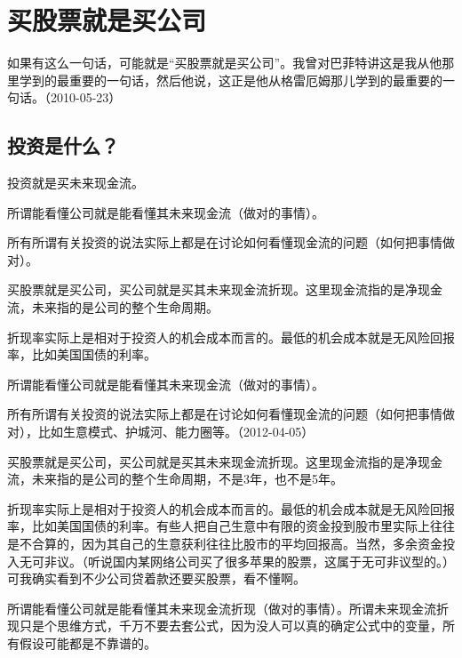 
\section{买股票就是买公司}


如果有这么一句话，可能就是“买股票就是买公司”。我曾对巴菲特讲这是我从他那里学到的最重要的一句话，然后他说，这正是他从格雷厄姆那儿学到的最重要的一句话。（2010-05-23）

\subsection{投资是什么？}


投资就是买未来现金流。

所谓能看懂公司就是能看懂其未来现金流（做对的事情）。

所有所谓有关投资的说法实际上都是在讨论如何看懂现金流的问题（如何把事情做对）。


买股票就是买公司，买公司就是买其未来现金流折现。这里现金流指的是净现金流，未来指的是公司的整个生命周期。

折现率实际上是相对于投资人的机会成本而言的。最低的机会成本就是无风险回报率，比如美国国债的利率。

所谓能看懂公司就是能看懂其未来现金流（做对的事情）。

所有所谓有关投资的说法实际上都是在讨论如何看懂现金流的问题（如何把事情做对），比如生意模式、护城河、能力圈等。（2012-04-05）


买股票就是买公司，买公司就是买其未来现金流折现。这里现金流指的是净现金流，未来指的是公司的整个生命周期，不是3年，也不是5年。

折现率实际上是相对于投资人的机会成本而言的。最低的机会成本就是无风险回报率，比如美国国债的利率。有些人把自己生意中有限的资金投到股市里实际上往往是不合算的，因为其自己的生意获利往往比股市的平均回报高。当然，多余资金投入无可非议。（听说国内某网络公司买了很多苹果的股票，这属于无可非议型的。）可我确实看到不少公司贷着款还要买股票，看不懂啊。

所谓能看懂公司就是能看懂其未来现金流折现（做对的事情）。所谓未来现金流折现只是个思维方式，千万不要去套公式，因为没人可以真的确定公式中的变量，所有假设可能都是不靠谱的。

